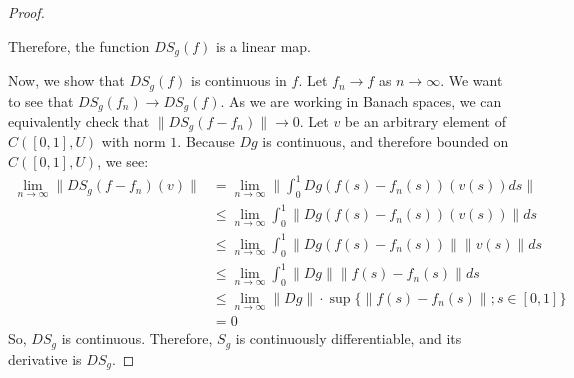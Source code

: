 \documentclass[12pt]{article}
\theoremstyle{definition}
\newenvironment{problem}[2][Problem]{\begin{trivlist}
\item[\hskip \labelsep {\bfseries #1}\hskip \labelsep {\bfseries #2.}]}{\end{trivlist}}
\begin{document}
\begin{problem}{4}
\begin{proof}
\begin{itemize}
 \end{itemize}\par Therefore, the function $DS_g(f)$ is a linear map. 
 \par Now, we show that $DS_g(f)$ is continuous in $f$. Let $f_n \to f$ as $n \to \infty$. We want to see that $DS_g(f_n) \to DS_g(f)$. As we are working in Banach spaces, we can equivalently check that $\lVert DS_g(f - f_n) \rVert \to 0$. Let $v$ be an arbitrary element of $C([0,1], U)$ with norm $1$. Because $Dg$ is continuous, and therefore bounded on $C([0,1],U)$, we see:
 \begin{align*}
	 \lim_{n\to\infty} \lVert DS_g(f - f_n)(v)\rVert &= \lim_{n \to \infty } \lVert \int_0^1 Dg(f(s) - f_n(s))(v(s))ds \rVert\\
	 &\leq \lim_{n\to\infty}\int_0^1 \left \lVert { Dg(f(s) - f_n(s))(v(s)) } \right \lVert ds\\
	 &\leq \lim_{n\to\infty}\int_0^1 \left \lVert { Dg(f(s) - f_n(s)) } \right \lVert  \left \lVert { v(s) } \right \lVert ds\\
	 &\leq \lim_{n\to\infty} \int_0^1 \left \lVert { Dg } \right \lVert  \left \lVert { f(s) - f_n(s) } \right \lVert ds\\
	 &\leq \lim_{n\to\infty}\left \lVert { Dg } \right \lVert\cdot \sup\{ \left \lVert { f(s) - f_n(s) } \right \lVert ; s \in [0,1] \}\\
	 &= 0
 \end{align*} 
 So, $DS_g$ is continuous. Therefore, $S_g$ is continuously differentiable, and its derivative is $DS_g$.
\end{proof}
\end{problem}
\end{document}
